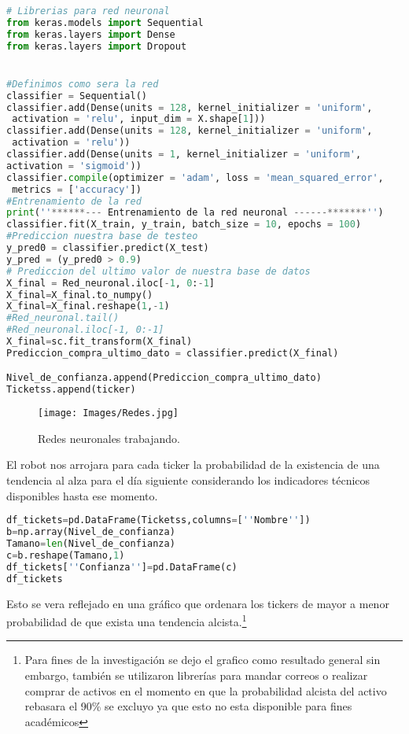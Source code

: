 \documentclass[letterpaper,12pt,oneside]{book}
\begin{document}
\begin{lstlisting}[language=Python]
# Librerias para red neuronal
from keras.models import Sequential
from keras.layers import Dense
from keras.layers import Dropout


#Definimos como sera la red
classifier = Sequential()
classifier.add(Dense(units = 128, kernel_initializer = 'uniform',
 activation = 'relu', input_dim = X.shape[1]))
classifier.add(Dense(units = 128, kernel_initializer = 'uniform',
 activation = 'relu'))
classifier.add(Dense(units = 1, kernel_initializer = 'uniform', 
activation = 'sigmoid'))
classifier.compile(optimizer = 'adam', loss = 'mean_squared_error',
 metrics = ['accuracy'])
#Entrenamiento de la red
print(''******--- Entrenamiento de la red neuronal ------*******'')
classifier.fit(X_train, y_train, batch_size = 10, epochs = 100)
#Prediccion nuestra base de testeo
y_pred0 = classifier.predict(X_test)
y_pred = (y_pred0 > 0.9)
# Prediccion del ultimo valor de nuestra base de datos
X_final = Red_neuronal.iloc[-1, 0:-1]
X_final=X_final.to_numpy()
X_final=X_final.reshape(1,-1)
#Red_neuronal.tail()
#Red_neuronal.iloc[-1, 0:-1]
X_final=sc.fit_transform(X_final)
Prediccion_compra_ultimo_dato = classifier.predict(X_final)

Nivel_de_confianza.append(Prediccion_compra_ultimo_dato)
Ticketss.append(ticker)

\end{lstlisting}


\begin{figure}[ht]
	\centering
	\texttt{[image: Images/Redes.jpg]}
	\caption{Redes neuronales trabajando.}
\end{figure}

El robot nos arrojara para cada ticker la probabilidad de la existencia de una tendencia al alza para el día siguiente considerando los indicadores técnicos disponibles hasta ese momento.

\begin{lstlisting}[language=Python]
df_tickets=pd.DataFrame(Ticketss,columns=[''Nombre''])
b=np.array(Nivel_de_confianza) 
Tamano=len(Nivel_de_confianza)
c=b.reshape(Tamano,1)
df_tickets[''Confianza'']=pd.DataFrame(c)
df_tickets
\end{lstlisting}

Esto se vera reflejado en una gráfico que ordenara los tickers de mayor a menor probabilidad de que exista una tendencia alcista.\footnote{Para fines de la investigación se dejo el grafico como resultado general sin embargo, también se utilizaron librerías para mandar correos o realizar comprar de activos en el momento en que la probabilidad alcista del activo rebasara el 90\% se excluyo ya que  esto no esta disponible para fines académicos }
\end{document}
